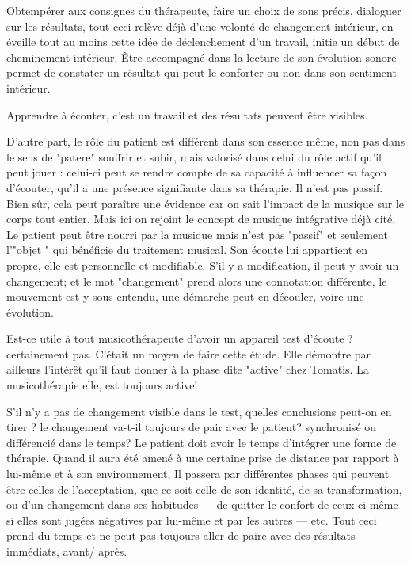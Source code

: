Obtempérer aux consignes du thérapeute, faire un choix de sons précis, dialoguer sur les résultats, tout ceci relève déjà d'une volonté de changement intérieur, en  éveille tout au moins cette idée de déclenchement d'un travail, initie un début de cheminement intérieur.
Être accompagné dans la lecture de son évolution sonore permet de constater un résultat qui  peut le conforter ou non dans son sentiment intérieur.



Apprendre à écouter, c'est un travail et des résultats peuvent être
visibles. 

	
	D'autre part, le rôle du patient est différent dans son essence même, non pas dans le sens de "patere" souffrir et subir, mais valorisé dans celui du rôle actif qu'il peut jouer : celui-ci peut se rendre compte de sa capacité à influencer sa façon d'écouter, qu'il a une présence signifiante dans sa thérapie.  Il n'est pas passif. Bien sûr, cela peut paraître une évidence car on sait l'impact de la musique sur le corps tout entier. Mais ici on rejoint  le concept de musique intégrative déjà cité\autocite[Cf.]{vrait_musicotherapie_2018}. Le patient peut être nourri par la musique mais n'est pas "passif" et seulement l'"objet " qui bénéficie du traitement musical. Son  écoute lui appartient en propre, elle est personnelle et modifiable. S'il y a modification, il peut y avoir un changement; et le mot "changement" prend alors une connotation différente,  le mouvement est y  sous-entendu,  une démarche peut en découler, voire une évolution. 



Est-ce utile à tout musicothérapeute d'avoir un appareil test d'écoute ? certainement pas. C'était un moyen de faire cette étude. Elle démontre par ailleurs l'intérêt qu'il faut donner à la phase dite "active" chez Tomatis. La musicothérapie elle, est toujours active!

S'il n'y a pas de changement visible dans le test, quelles conclusions
peut-on en tirer ? le changement va-t-il toujours de pair avec le
patient? synchronisé ou différencié dans le temps?
Le patient doit avoir le temps d'intégrer une forme de thérapie. Quand il aura été amené à une certaine prise de distance par rapport à lui-même et à son environnement, Il passera par différentes phases qui peuvent être celles de l'acceptation, que ce soit celle de son identité, de sa transformation, ou d'un changement dans ses habitudes --- de quitter le confort de ceux-ci même si elles sont jugées négatives par lui-même et par les autres --- etc. Tout ceci prend du temps et ne peut pas 
toujours  aller de paire avec des résultats immédiats, avant/ après.


